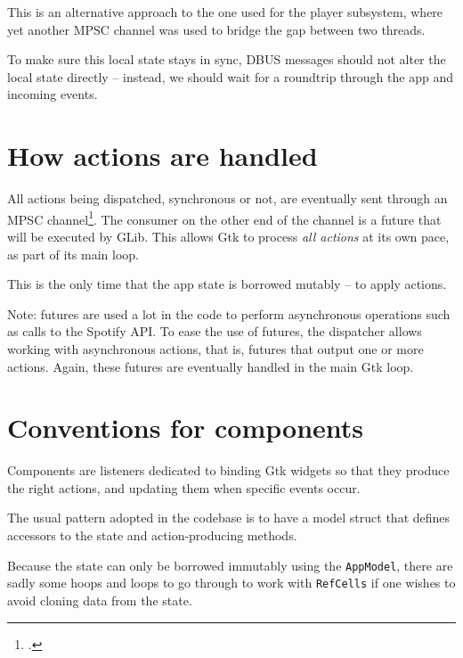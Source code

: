 \documentclass[12pt, a4paper]{article}
\begin{document}
This is an alternative approach to the one used for the player subsystem, where yet another MPSC channel was used to bridge the gap between two threads.

To make sure this local state stays in sync, DBUS messages should not alter the local state directly -- instead, we should wait for a roundtrip through the app and incoming events.

\section{How actions are handled}

All actions being dispatched, synchronous or not, are eventually sent through an MPSC channel\footcite{mpsc}. The consumer on the other end of the channel is a future that will be executed by GLib. This allows Gtk to process \emph{all actions} at its own pace, as part of its main loop.

This is the only time that the app state is borrowed mutably -- to apply actions.

Note: futures are used a lot in the code to perform asynchronous operations such as calls to the Spotify API. To ease the use of futures, the dispatcher allows working with asynchronous actions, that is, futures that output one or more actions. Again, these futures are eventually handled in the main Gtk loop.

\section{Conventions for components}

Components are listeners dedicated to binding Gtk widgets so that they produce the right actions, and updating them when specific events occur.

The usual pattern adopted in the codebase is to have a model struct that defines accessors to the state and action-producing methods.

Because the state can only be borrowed immutably using the 
\texttt{AppModel}, there are sadly some hoops and loops to go through to work with \texttt{RefCells} if one wishes to avoid cloning data from the state.
\end{document}
